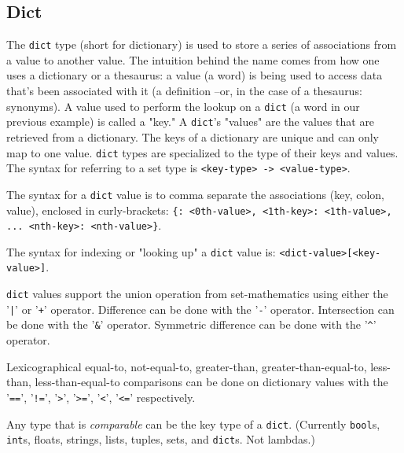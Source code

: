 
\subsection{Dict}
{
	The \texttt{dict} type (short for dictionary) is used to store
	a series of associations from a value to another value.
	The intuition behind the name comes from how one uses a dictionary or a
	thesaurus: a value (a word) is being used to access data that's been
	associated with it (a definition --or, in the case of a thesaurus: synonyms).
	A value used to perform the lookup on a \texttt{dict} (a word in our
	previous example) is called a "key." A \texttt{dict}'s "values" are the
	values that are retrieved from a dictionary.
	The keys of a dictionary are unique and can only map to one value.
	\texttt{dict} types are specialized to the type of their keys and values.
	The syntax for referring to a set type
	is \texttt{<key-type> -> <value-type>}.
	
	The syntax for a \texttt{dict} value is to comma
	separate the associations (key, colon, value), enclosed in
	curly-brackets: \texttt{\{<0th-key>: <0th-value>, <1th-key>: <1th-value>, ... <nth-key>: <nth-value>\}}.
	
	The syntax for indexing or "looking up" a \texttt{dict} value
	is: \texttt{<dict-value>[<key-value>]}.
	
	\texttt{dict} values support the union operation from set-mathematics using
	either the '\texttt{|}' or '\texttt{+}' operator. 
	Difference can be done with the '\texttt{-}' operator.
	Intersection can be done with the '\texttt{\&}' operator.
	Symmetric difference can be done with the '\texttt{\^}' operator.
	
	Lexicographical equal-to, not-equal-to, greater-than, greater-than-equal-to,
	less-than, less-than-equal-to comparisons can be done on dictionary values with
	the '\texttt{==}', '\texttt{!=}',
	'\texttt{>}', '\texttt{>=}', '\texttt{<}', '\texttt{<=}' respectively.
	
	Any type that is \textit{comparable} can be the key type of a \texttt{dict}.
	(Currently \texttt{bool}s, \texttt{int}s, floats, strings, lists, tuples,
		sets, and \texttt{dict}s. Not lambdas.)
}
